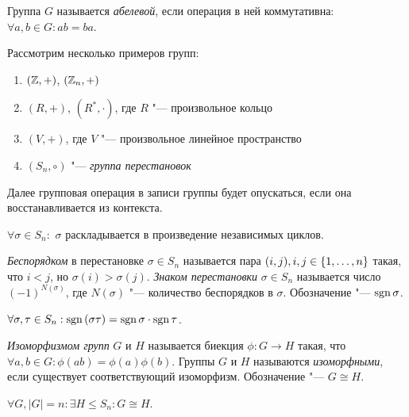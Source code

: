 \begin{definition}
	Группа $G$ называется \textit{абелевой}, если операция в ней коммутативна: $\forall a, b \in G: ab = ba$.
\end{definition}

\begin{example}
	Рассмотрим несколько примеров групп:
	\begin{enumerate}
		\item $(\mathbb{Z}, +)$, $(\mathbb{Z}_n, +)$
		
		\item $(R, +)$, $(R^*, \cdot)$, где $R$ "--- произвольное кольцо
		
		\item $(V, +)$, где $V$ "--- произвольное линейное пространство
		
		\item $(S_n, \circ)$ "--- \textit{группа перестановок}
	\end{enumerate}
	
	Далее групповая операция в записи группы будет опускаться, если она восстанавливается из контекста.
\end{example}

\begin{reminder}
	$\forall \sigma \in S_n:$ $\sigma$ раскладывается в произведение независимых циклов.
\end{reminder}

\begin{definition}
	\textit{Беспорядком} в перестановке $\sigma \in S_n$ называется пара $(i, j), i, j \hm\in \{1, \dotsc, n\}$ такая, что $i < j$, но $\sigma(i) > \sigma(j)$. \textit{Знаком перестановки} $\sigma \in S_n$ называется число $(-1)^{N(\sigma)}$, где $N(\sigma)$ "--- количество беспорядков в $\sigma$. Обозначение "--- $\operatorname{\mathop{sgn}}{\sigma}$.
\end{definition}

\begin{reminder}
	$\forall \sigma, \tau \in S_n: \operatorname{\mathop{sgn}}{(\sigma\tau)} = \operatorname{\mathop{sgn}}{\sigma}\cdot\operatorname{\mathop{sgn}}{\tau}$.
\end{reminder}

\begin{definition}
	\textit{Изоморфизмом групп} $G$ и $H$ называется биекция $\phi: G \to H$ такая, что $\forall a, b \in G: \phi(ab) = \phi(a)\phi(b)$. Группы $G$ и $H$ называются \textit{изоморфными}, если существует соответствующий изоморфизм. Обозначение "--- $G \cong H$.
\end{definition}

\begin{reminder}
	$\forall G, |G| = n: \exists H \le S_n: G \cong H$.
\end{reminder}

